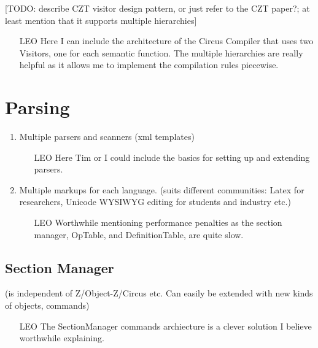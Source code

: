 \documentclass{llncs}
\begin{document}
  [TODO: describe CZT visitor design pattern, or just refer to the CZT
  paper?; at least mention that it supports multiple hierarchies]


  \begin{itemize}
    \item[LEO] Here I can include the architecture of the Circus
      Compiler that uses two Visitors, one for each semantic function.
      The multiple hierarchies are really helpful as it allows me to
      implement the compilation rules piecewise.
  \end{itemize}

\section{Parsing}

  \begin{enumerate}
    \item Multiple parsers and scanners (xml templates)
        \begin{itemize}
            \item[LEO] Here Tim or I could include the basics for setting up and extending parsers.
        \end{itemize}

    \item Multiple markups for each language.
      (suits different communities:  Latex for researchers,
      Unicode WYSIWYG editing for students and industry etc.)
      \begin{itemize}
         \item[LEO] Worthwhile mentioning performance penalties as the section manager,
                OpTable, and DefinitionTable, are quite slow.
      \end{itemize}
  \end{enumerate}

\subsection{Section Manager}

  (is independent of Z/Object-Z/Circus etc.
  Can easily be extended with new kinds of objects, commands)

    \begin{itemize}
        \item[LEO] The SectionManager commands archiecture is a clever solution I believe worthwhile explaining.
    \end{itemize}
\end{document}
